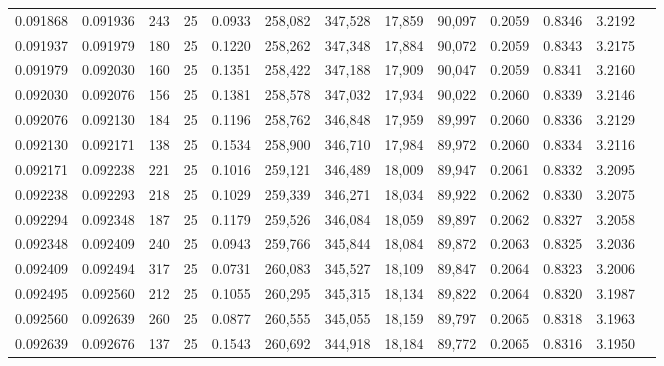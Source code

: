 \begin{tabular}{rrrrrrrrrrrrr}
0.091868 & 0.091936 &   243 &  25 &                                     0.0933 & 258,082 & 347,528 &  17,859 &  90,097 & 0.2059 & 0.8346 & 3.2192 \\
0.091937 & 0.091979 &   180 &  25 &                                     0.1220 & 258,262 & 347,348 &  17,884 &  90,072 & 0.2059 & 0.8343 & 3.2175 \\
0.091979 & 0.092030 &   160 &  25 &                                     0.1351 & 258,422 & 347,188 &  17,909 &  90,047 & 0.2059 & 0.8341 & 3.2160 \\
0.092030 & 0.092076 &   156 &  25 &                                     0.1381 & 258,578 & 347,032 &  17,934 &  90,022 & 0.2060 & 0.8339 & 3.2146 \\
0.092076 & 0.092130 &   184 &  25 &                                     0.1196 & 258,762 & 346,848 &  17,959 &  89,997 & 0.2060 & 0.8336 & 3.2129 \\
0.092130 & 0.092171 &   138 &  25 &                                     0.1534 & 258,900 & 346,710 &  17,984 &  89,972 & 0.2060 & 0.8334 & 3.2116 \\
0.092171 & 0.092238 &   221 &  25 &                                     0.1016 & 259,121 & 346,489 &  18,009 &  89,947 & 0.2061 & 0.8332 & 3.2095 \\
0.092238 & 0.092293 &   218 &  25 &                                     0.1029 & 259,339 & 346,271 &  18,034 &  89,922 & 0.2062 & 0.8330 & 3.2075 \\
0.092294 & 0.092348 &   187 &  25 &                                     0.1179 & 259,526 & 346,084 &  18,059 &  89,897 & 0.2062 & 0.8327 & 3.2058 \\
0.092348 & 0.092409 &   240 &  25 &                                     0.0943 & 259,766 & 345,844 &  18,084 &  89,872 & 0.2063 & 0.8325 & 3.2036 \\
0.092409 & 0.092494 &   317 &  25 &                                     0.0731 & 260,083 & 345,527 &  18,109 &  89,847 & 0.2064 & 0.8323 & 3.2006 \\
0.092495 & 0.092560 &   212 &  25 &                                     0.1055 & 260,295 & 345,315 &  18,134 &  89,822 & 0.2064 & 0.8320 & 3.1987 \\
0.092560 & 0.092639 &   260 &  25 &                                     0.0877 & 260,555 & 345,055 &  18,159 &  89,797 & 0.2065 & 0.8318 & 3.1963 \\
0.092639 & 0.092676 &   137 &  25 &                                     0.1543 & 260,692 & 344,918 &  18,184 &  89,772 & 0.2065 & 0.8316 & 3.1950 \\

\end{tabular}
